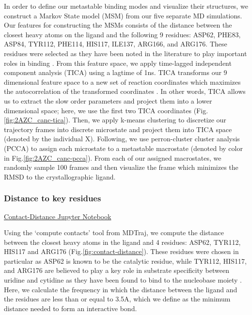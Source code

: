 \documentclass[fleqn,10pt]{wlscirep}
\begin{document}
In order to define our metastable binding modes and visualize their structures, we construct a Markov State model (MSM) \cite{prinz2011markov} from our five separate MD simulations.
Our features for constructing the MSMs consists of the distance between the closest heavy atoms on the ligand and the following 9 residues: ASP62, PHE83, ASP84, TYR112, PHE114, HIS117, ILE137, ARG166, and ARG176.
These residues were selected as they have been noted in the literature to play important roles in binding \cite{tanaka2016molecular}.
From this feature space, we apply time-lagged independent component analysis (TICA) using a lagtime of 1ns.
TICA transforms our 9 dimensional feature space to a new set of reaction coordinates which maximizes the autocorrelation of the transformed coordinates \cite{perez2013identification}.
In other words, TICA allows us to extract the slow order parameters and project them into a lower dimensional space; here, we use the first two TICA coordinates (Fig. \ref{fig:2AZC_canc-tica}).
Then, we apply k-means clustering to discretize our trajectory frames into discrete microstate and project them into TICA space (denoted by the individual X).
Following, we use perron-cluster cluster analysis (PCCA) \cite{roblitz2013fuzzy} to assign each microstate to a metastable macrostate (denoted by color in Fig.\ref{fig:2AZC_canc-pcca}).
From each of our assigned macrostates, we randomly sample 100 frames and then visualize the frame which minimizes the RMSD to the crystallographic ligand.

\subsubsection{Distance to key residues}

\href{https://github.com/nathanmlim/Spitale/blob/master/manual_md/notebooks/contact-distance.ipynb}{Contact-Distance Jupyter Notebook}

Using the `compute contacts' tool from MDTraj, we compute the distance between the closest heavy atoms in the ligand and 4 residues: ASP62, TYR112, HIS117 and ARG176 (Fig.\ref{fig:contact-distance}).
These residues were chosen in particular as ASP62 is known to be the catalytic residue, while TYR112, HIS117, and ARG176 are believed to play a key role in substrate specificity between uridine and cytidine as they have been found to bind to the nucleobase moiety \cite{tanaka2016molecular}.
Here, we calculate the frequency in which the distance between the ligand and the residues are less than or equal to 3.5A, which we define as the minimum distance needed to form an interactive bond.
\end{document}
